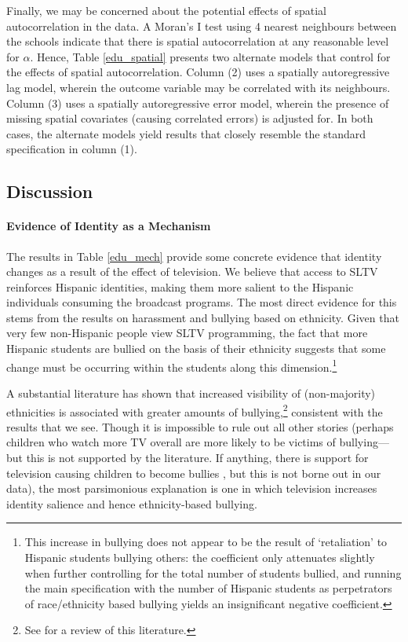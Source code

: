 \documentclass[11pt]{article}
\begin{document}
Finally, we may be concerned about the potential effects of spatial autocorrelation in the data. A Moran's I test using 4 nearest neighbours between the schools indicate that there is spatial autocorrelation at any reasonable level for $\alpha$. Hence, Table \ref{edu_spatial} presents two alternate models that control for the effects of spatial autocorrelation. Column (2) uses a spatially autoregressive lag model, wherein the outcome variable may be correlated with its neighbours. Column (3) uses a spatially autoregressive error model, wherein the presence of missing spatial covariates (causing correlated errors) is adjusted for. In both cases, the alternate models yield results that closely resemble the standard specification in column (1). 


\subsection{Discussion}

\paragraph{Evidence of Identity as a Mechanism}
The results in Table \ref{edu_mech} provide some concrete evidence that identity changes as a result of the effect of television. We believe that access to SLTV reinforces Hispanic identities, making them more salient to the Hispanic individuals consuming the broadcast programs. The most direct evidence for this stems from the results on harassment and bullying based on ethnicity. Given that very few non-Hispanic people view SLTV programming, the fact that more Hispanic students are bullied on the basis of their ethnicity suggests that some change must be occurring within the students along this dimension.\footnote{ This increase in bullying does not appear to be the result of `retaliation' to Hispanic students bullying others: the coefficient only attenuates slightly when further controlling for the total number of students bullied, and running the main specification with the number of Hispanic students as perpetrators of race/ethnicity based bullying yields an insignificant negative coefficient. } 

A substantial literature has shown that increased visibility of (non-majority) ethnicities is associated with greater amounts of bullying,\footnote{ See \cite{scherr_bullying_2009} for a review of this literature.} consistent with the results that we see. Though it is impossible to rule out all other stories (perhaps children who watch more TV overall are more likely to be victims of bullying---but this is not supported by the literature. If anything, there is support for television causing children to become bullies \citep{kuntsche_television_2006}, but this is not borne out in our data), the most parsimonious explanation is one in which television increases identity salience and hence ethnicity-based bullying.
\end{document}
